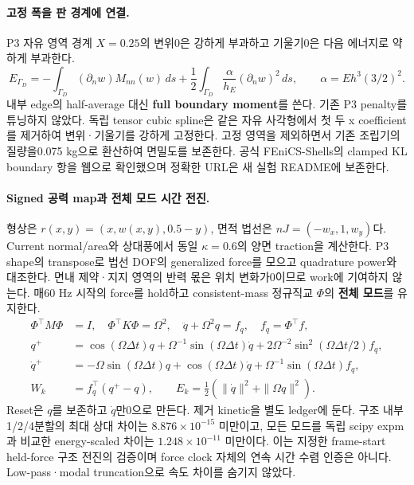 \documentclass[10pt]{article}
\begin{document}
\paragraph{고정 폭을 판 경계에 연결.}
P3 자유 영역 경계 \(X=0.25\)의 변위0은 강하게 부과하고 기울기0은 다음 에너지로 약하게 부과한다.
\begin{equation}
 E_{\Gamma_D}=-\int_{\Gamma_D}(\partial_n w)M_{nn}(w)\,ds
   +\frac12\int_{\Gamma_D}\frac{\alpha}{h_E}(\partial_n w)^2\,ds,
 \qquad \alpha=Eh^3(3/2)^2 .
 \label{eq:r1-p3-clamp}
\end{equation}
내부 edge의 half-average 대신 \textbf{full boundary moment}를 쓴다. 기존 P3 penalty를 튜닝하지 않았다.
독립 tensor cubic spline은 같은 자유 사각형에서 첫 두 x coefficient를 제거하여 변위·기울기를 강하게 고정한다.
고정 영역을 제외하면서 기존 조립기의 질량을0.075 kg으로 환산하여 면밀도를 보존한다.
공식 FEniCS-Shells의 clamped KL boundary 항을 웹으로 확인했으며 정확한 URL은 새 실험 README에 보존한다.

\paragraph{Signed 공력 map과 전체 모드 시간 전진.}
형상은 \(r(x,y)=(x,w(x,y),0.5-y)\), 면적 법선은
\(nJ=(-w_x,1,w_y)\)다. Current normal/area와 상대풍에서 동일 \(\kappa=0.6\)의 양면 traction을 계산한다.
P3 shape의 transpose로 법선 DOF의 generalized force를 모으고 quadrature power와 대조한다.
면내 제약·지지 영역의 반력 몫은 위치 변화가0이므로 work에 기여하지 않는다.
매60 Hz 시작의 force를 hold하고 consistent-mass 정규직교 \(\Phi\)의 \textbf{전체 모드}를 유지한다.
\begin{equation}
 \begin{aligned}
  \Phi^\top M\Phi&=I,\quad \Phi^\top K\Phi=\Omega^2,\quad
  \ddot q+\Omega^2q=f_q,\quad f_q=\Phi^\top f,\\
  q^+&=\cos(\Omega\Delta t)q+\Omega^{-1}\sin(\Omega\Delta t)\dot q
       +2\Omega^{-2}\sin^2(\Omega\Delta t/2)f_q,\\
  \dot q^+&=-\Omega\sin(\Omega\Delta t)q+\cos(\Omega\Delta t)\dot q
       +\Omega^{-1}\sin(\Omega\Delta t)f_q,\\
  W_k&=f_q^\top(q^+-q),\qquad E_k=\tfrac12(\|\dot q\|^2+\|\Omega q\|^2).
 \end{aligned}
 \label{eq:r1-p3-exact-held}
\end{equation}
Reset은 \(q\)를 보존하고 \(\dot q\)만0으로 만든다. 제거 kinetic을 별도 ledger에 둔다.
구조 내부1/2/4분할의 최대 상대 차이는 \(8.876\times10^{-15}\) 미만이고,
모든 모드를 독립 scipy expm과 비교한 energy-scaled 차이는 \(1.248\times10^{-11}\) 미만이다.
이는 지정한 frame-start held-force 구조 전진의 검증이며 force clock 자체의 연속 시간 수렴 인증은 아니다.
Low-pass·modal truncation으로 속도 차이를 숨기지 않았다.
\end{document}
